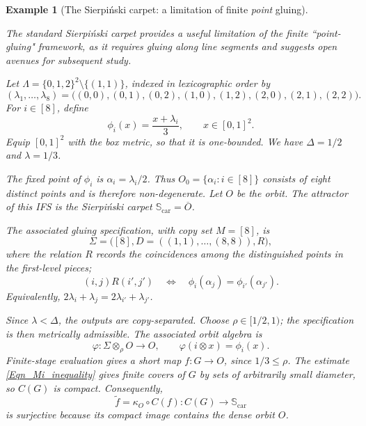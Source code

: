 \documentclass{sn-jnl}%
\theoremstyle{thmstyleone}%
\theoremstyle{thmstyletwo}%
\newtheorem{example}{Example}%
\theoremstyle{thmstylethree}%
\newcommand{\M}{\Sigma}
\newcommand{\Fw}{\M\otimes_{\w}}
\newcommand{\f}{\phi}
\newcommand{\w}{\rho}
\newcommand{\ft}{\widetilde f}
\begin{document}
\begin{example}[The Sierpiński carpet: a limitation of finite \textit{point} gluing]
\label{Ex_Sierpinski_Carpet_IFS}
    
    The standard Sierpiński carpet provides a useful limitation of the finite
    ``{point}-gluing" framework, as it requires gluing along line segments and suggests open avenues for subsequent study. 
    
    Let $\Lambda=\{0,1,2\}^2\setminus\{(1,1)\}$, indexed in lexicographic order by
    \begin{equation}
    \nonumber
        (\lambda_1,\ldots,\lambda_8)=\bigl((0,0),(0,1),(0,2),(1,0),(1,2),(2,0),(2,1),(2,2)\bigr).
    \end{equation}
    For $i\in[8]$, define
    \begin{equation} 
    \nonumber
       \f_i(x)=\frac{x+\lambda_i}{3}, \qquad x\in[0,1]^2.
    \end{equation}
    Equip $[0,1]^2$ with the box metric, so that it is one-bounded. We have $\Delta = 1/2$ and $\lambda =1/3$.  
    
    The fixed point of $\f_i$ is $\alpha_i=\lambda_i/2$. Thus $O_0=\{\alpha_i:i\in[8]\}$ consists of eight distinct points and is therefore non-degenerate. Let $O$ be the orbit.  The attractor of this IFS is the Sierpiński carpet $\mathbb S_{\mathrm{car}} = \overline O $. 
     
    The associated gluing specification, with copy set $M=[8]$, is 
    \begin{equation}
    \nonumber
        \Sigma=\bigl([8],D=((1,1),\ldots,(8,8)),R\bigr),
    \end{equation}
    where  the relation $R$ records the coincidences among the distinguished points in the first-level pieces;
    \begin{equation} \nonumber
       (i,j)R(i',j')\quad\Longleftrightarrow\quad\f_i(\alpha_j)=\f_{i'}(\alpha_{j'}).
    \end{equation}
    Equivalently, $2\lambda_i+\lambda_j=2\lambda_{i'}+\lambda_{j'}$.
    
    Since $\lambda<\Delta$, the outputs are copy-separated. Choose $\rho\in[1/2,1)$; the specification is then metrically admissible. The associated orbit algebra is
    \begin{equation} 
    \nonumber
       \varphi:\Fw O\longrightarrow O, \qquad \varphi(i\otimes x)=\f_i(x).
    \end{equation}
    Finite-stage evaluation gives a short map $f:G\to O$, since     $1/3\leq\rho$. The estimate \eqref{Eqn_Mi_inequality} gives finite covers of $G$ by sets of arbitrarily small diameter, so $C(G)$ is compact. Consequently,
    \begin{equation} 
    \nonumber
       \ft  =\kappa_O\circ C(f):C(G)\longrightarrow\mathbb S_{\mathrm{car}}
    \end{equation}
    is surjective because its compact image contains the dense orbit $O$.


\end{example}
\end{document}
